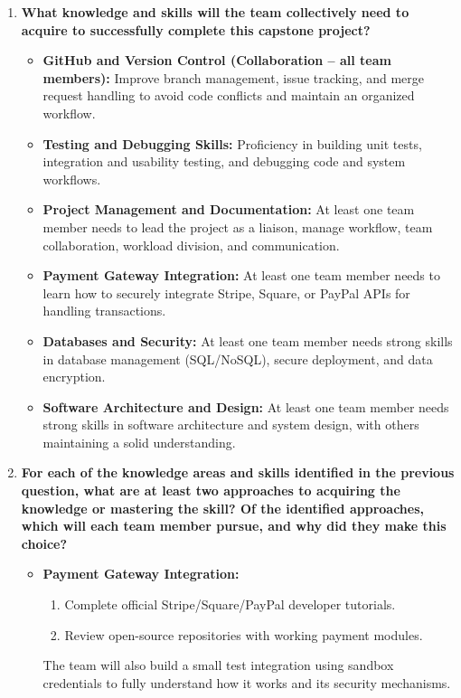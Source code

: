 \begin{enumerate}
  \item \textbf{What knowledge and skills will the team collectively need to acquire to successfully complete this capstone project?} \\ 
  \begin{itemize}
    \item \textbf{GitHub and Version Control (Collaboration – all team members):} Improve branch management, issue tracking, and merge request handling to avoid code conflicts and maintain an organized workflow.
    \item \textbf{Testing and Debugging Skills:} Proficiency in building unit tests, integration and usability testing, and debugging code and system workflows.
    \item \textbf{Project Management and Documentation:} At least one team member needs to lead the project as a liaison, manage workflow, team collaboration, workload division, and communication.
    \item \textbf{Payment Gateway Integration:} At least one team member needs to learn how to securely integrate Stripe, Square, or PayPal APIs for handling transactions.
    \item \textbf{Databases and Security:} At least one team member needs strong skills in database management (SQL/NoSQL), secure deployment, and data encryption.
    \item \textbf{Software Architecture and Design:} At least one team member needs strong skills in software architecture and system design, with others maintaining a solid understanding.
  \end{itemize}

  \item \textbf{For each of the knowledge areas and skills identified in the previous question, what are at least two approaches to acquiring the knowledge or mastering the skill? Of the identified approaches, which will each team member pursue, and why did they make this choice?} \\ 
  \begin{itemize}
    \item \textbf{Payment Gateway Integration:}
      \begin{enumerate}
        \item Complete official Stripe/Square/PayPal developer tutorials.
        \item Review open-source repositories with working payment modules.
      \end{enumerate}
      The team will also build a small test integration using sandbox credentials to fully understand how it works and its security mechanisms.


\end{itemize}
\end{enumerate}
